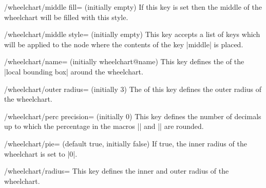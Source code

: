 \documentclass[a4paper,english,dvipsnames]{ltxdoc}
\begin{document}
\begin{stylekey}{/wheelchart/middle fill= (initially \normalfont empty)}
If this key is set then the middle of the wheelchart will be filled with this style.
\begin{codeexample}[width=10cm]
\begin{tikzpicture}
\wheelchart[
    counterclockwise,
    data={},
    middle fill={
        Green,
        draw=Red,
        ultra thick
    },
    radius={0.8*\WCcount}
        {0.4+0.8*\WCcount},
    slices style={
        draw=Blue,
        fill=none,
        ultra thick
    },
    start angle=0,
    total angle=300,
    total count=4,
    value=1
]{}
\end{tikzpicture}
\end{codeexample}
\end{stylekey}
\begin{stylekey}{/wheelchart/middle style= (initially \normalfont empty)}
This key accepts a list of keys which will be applied to the node where the contents of the key |middle| is placed.
\end{stylekey}
\begin{key}{/wheelchart/name= (initially wheelchart@name)}
This key defines the  of the |local bounding box| around the wheelchart.
\end{key}
\begin{key}{/wheelchart/outer radius= (initially 3)}
The  of this key defines the outer radius of the wheelchart.
\end{key}
\begin{key}{/wheelchart/perc precision= (initially 0)}
This key defines the number of decimals up to which the percentage in the macros |\WCperc| and |\WCpercentagerounded| are rounded.
\end{key}
\begin{key}{/wheelchart/pie= (default true, initially false)}
If true, the inner radius of the wheelchart is set to |0|.
\end{key}
\begin{key}{/wheelchart/radius=}
This key defines the inner and outer radius of the wheelchart.
\begin{codeexample}[width=10cm]
\end{codeexample}
\begin{codeexample}[width=10cm,preamble={\usepackage{siunitx}}]
\end{codeexample}
\end{key}
\end{document}
